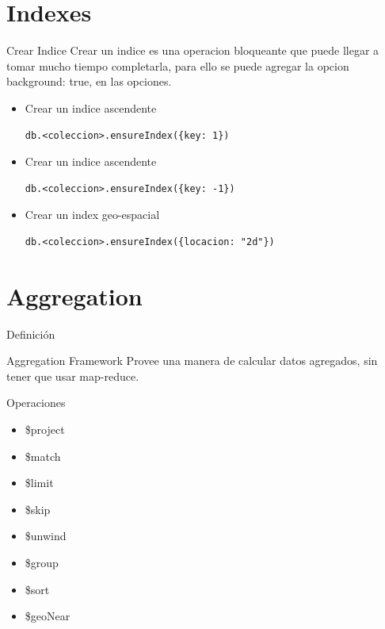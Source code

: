 \documentclass[12pt]{beamer}
\begin{document}
\section{Indexes}

\begin{frame}[fragile]{Crear Indice}
  Crear un indice es una operacion bloqueante que puede llegar a tomar
  mucho tiempo completarla, para ello se puede agregar la opcion 
  {background: true}, en las opciones.

  \begin{itemize}
  \item Crear un indice ascendente
    \begin{verbatim}
db.<coleccion>.ensureIndex({key: 1})
    \end{verbatim}

  \item Crear un indice ascendente
    \begin{verbatim}
db.<coleccion>.ensureIndex({key: -1})
    \end{verbatim}


    \item Crear un index geo-espacial
    \begin{verbatim}
db.<coleccion>.ensureIndex({locacion: "2d"})
    \end{verbatim}
  \end{itemize}
\end{frame}


\section{Aggregation}
\begin{frame}{Definición}
\
\begin{block}{Aggregation Framework}
  Provee una manera de calcular datos agregados, sin tener que usar map-reduce.
\end{block}
\end{frame}

\begin{frame}{Operaciones}
  
  \begin{itemize}
    \item \$project
    \item \$match
    \item \$limit
    \item \$skip
    \item \$unwind
    \item \$group
    \item \$sort
    \item \$geoNear    
    \end{itemize}
\end{frame}
\end{document}
